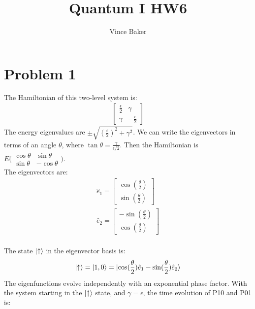 \documentclass[a4paper,12pt]{article}
\title{Quantum I HW6}
\author{Vince Baker}
\numberwithin{equation}{section}
\begin{document}
\maketitle

\section{Problem 1}
The Hamiltonian of this two-level system is:
\begin{gather}
 \begin{bmatrix}
  \frac{\epsilon}{2} & \gamma\\
  \gamma    & -\frac{\epsilon}{2}
 \end{bmatrix}
\end{gather}
The energy eigenvalues are $\pm\sqrt{(\frac{\epsilon}{2})^2+\gamma^2}$.
We can write the eigenvectors in terms of an angle $\theta$, where $\tan \theta = \frac{\gamma}{\epsilon/2}$.
Then the Hamiltonian is $E\bigl ( \begin{smallmatrix}
				      \cos \theta & \sin \theta \\
				      \sin \theta & -\cos \theta
                                  \end{smallmatrix}
\bigr )$. \\
The eigenvectors are:
\begin{gather}
 \hat{e}_1= \begin{bmatrix}\cos(\frac{\theta}{2})\\ \sin(\frac{\theta}{2}) \end{bmatrix}\\
 \hat{e}_2= \begin{bmatrix}-\sin(\frac{\theta}{2})\\ \cos(\frac{\theta}{2}) \end{bmatrix}\\
\end{gather}

The state $\ket{\uparrow}$ in the eigenvector basis is:
\begin{gather}
 \ket{\uparrow}=\ket{1,0}=\ket{\cos(\frac{\theta}{2}) \hat{e}_1 -\sin(\frac{\theta}{2}) \hat{e}_2}\\
\end{gather}
The eigenfunctions evolve independently with an exponential phase factor. 
With the system starting in the $\ket{\uparrow}$ state, and $\gamma=\epsilon$, the time evolution of P10 and P01 is:
\end{document}
